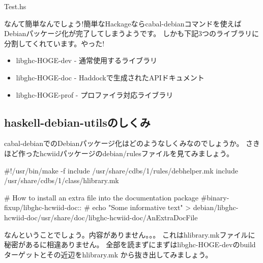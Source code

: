 \documentclass[mingoth,a4paper]{jsarticle}
\begin{document}
Test.hs

なんて簡単なんでしょう!簡単なHackageならcabal-debianコマンドを使えば
Debianパッケージ化が完了してしまうようです。
しかも下記3つのライブラリに分割してくれています。やった!

\begin{itemize}
 \item libghc-HOGE-dev  - 通常使用するライブラリ
 \item libghc-HOGE-doc  - Haddockで生成されたAPIドキュメント
 \item libghc-HOGE-prof - プロファイラ対応ライブラリ
\end{itemize}

\subsection{haskell-debian-utilsのしくみ}

cabal-debianでのDebianパッケージ化はどのようなしくみなのでしょうか。
さきほど作ったhcwiidパッケージのdebian/rulesファイルを見てみましょう。

\begin{commandline}
#!/usr/bin/make -f
include /usr/share/cdbs/1/rules/debhelper.mk
include /usr/share/cdbs/1/class/hlibrary.mk

# How to install an extra file into the documentation package
#binary-fixup/libghc-hcwiid-doc::
#       echo "Some informative text" > debian/libghc-hcwiid-doc/usr/share/doc/libghc-hcwiid-doc/AnExtraDocFile
\end{commandline}

なんということでしょう。内容がありません。。。
これはhlibrary.mkファイルに秘密があるに相違ありません。
全部を読まずにまずはlibghc-HOGE-devのbuildターゲットとその近辺をhlibrary.mk
から抜き出してみましょう。
\end{document}

